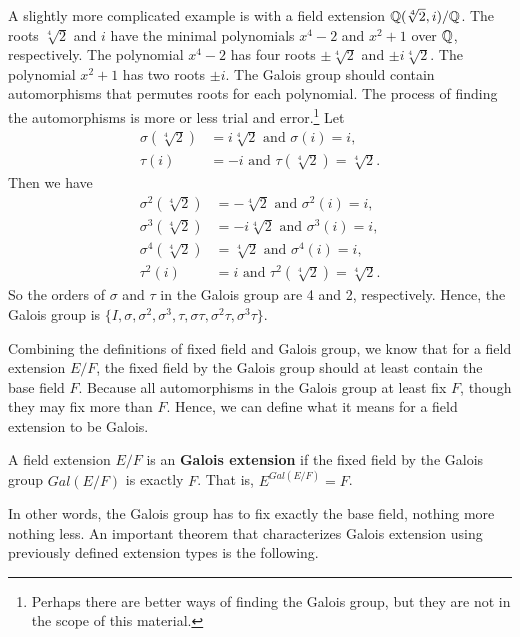 \documentclass[../main.tex]{subfiles}
\begin{document}
\begin{example}
A slightly more complicated example is with a field extension $\mathbb{Q}(\sqrt[4]{2},i)/\mathbb{Q}$. The roots $\sqrt[4]{2}$ and $i$ have the minimal polynomials $x^4-2$ and $x^2+1$ over $\mathbb{Q}$, respectively. The polynomial $x^4-2$ has four roots $\pm \sqrt[4]{2}$ and $\pm i\sqrt[4]{2}$. The polynomial $x^2+1$ has two roots $\pm i$. The Galois group should contain automorphisms that permutes roots for each polynomial. The process of finding the automorphisms is more or less trial and error.\footnote{Perhaps there are better ways of finding the Galois group, but they are not in the scope of this material.} Let 
\begin{align*}
    \sigma(\sqrt[4]{2}) &= i\sqrt[4]{2} \text{ and } \sigma(i)=i,\\
    \tau(i)&=-i \text{ and } \tau(\sqrt[4]{2})=\sqrt[4]{2}.
\end{align*}
Then we have 
\begin{align*}
    \sigma^2(\sqrt[4]{2}) &= -\sqrt[4]{2} \text{ and } \sigma^2(i)=i,\\
    \sigma^3(\sqrt[4]{2}) &= -i\sqrt[4]{2} \text{ and } \sigma^3(i)=i,\\
    \sigma^4(\sqrt[4]{2}) &= \sqrt[4]{2} \text{ and } \sigma^4(i)=i,\\
    \tau^2(i)&=i \text{ and } \tau^2(\sqrt[4]{2})=\sqrt[4]{2}.
\end{align*}
So the orders of $\sigma$ and $\tau$ in the Galois group are 4 and 2, respectively. Hence, the Galois group is $\{I, \sigma,\sigma^2,\sigma^3,\tau,\sigma\tau,\sigma^2\tau,\sigma^3\tau\}$.
\end{example}

Combining the definitions of fixed field and Galois group, we know that for a field extension $E/F$, the fixed field by the Galois group %
should at least contain the base field $F$. Because all automorphisms in the Galois group at least fix $F$, though they may fix more than $F$. 
Hence, we can define what it means for a field extension to be Galois. 

\reversemarginpar
{}
\begin{definition}
A field extension $E/F$ is an \textbf{Galois extension} if the fixed field by the Galois group $Gal(E/F)$ is exactly $F$. That is, $E^{Gal(E/F)} = F$.
\end{definition}

In other words, the Galois group has to fix exactly the base field, nothing more nothing less. An important theorem that characterizes Galois extension using previously defined extension types is the following. 
\end{document}
